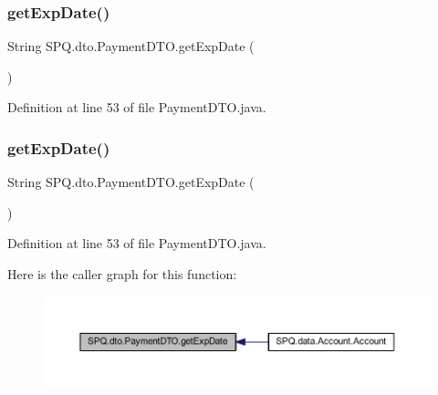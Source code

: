 \subsubsection{\texorpdfstring{get\+Exp\+Date()}{getExpDate()}\hspace{0.1cm}{\footnotesize\ttfamily [2/3]}}
{\footnotesize\ttfamily String S\+P\+Q.\+dto.\+Payment\+D\+T\+O.\+get\+Exp\+Date (\begin{DoxyParamCaption}{ }\end{DoxyParamCaption})}



Definition at line 53 of file Payment\+D\+T\+O.\+java.

\mbox{\label{class_s_p_q_1_1dto_1_1_payment_d_t_o_aa91402a8c96a306fcf125973e4f35912}} 
\subsubsection{\texorpdfstring{get\+Exp\+Date()}{getExpDate()}\hspace{0.1cm}{\footnotesize\ttfamily [3/3]}}
{\footnotesize\ttfamily String S\+P\+Q.\+dto.\+Payment\+D\+T\+O.\+get\+Exp\+Date (\begin{DoxyParamCaption}{ }\end{DoxyParamCaption})}



Definition at line 53 of file Payment\+D\+T\+O.\+java.

Here is the caller graph for this function\+:
\nopagebreak
\begin{figure}[H]
\begin{center}
\leavevmode
\includegraphics[width=350pt]{class_s_p_q_1_1dto_1_1_payment_d_t_o_aa91402a8c96a306fcf125973e4f35912_icgraph}
\end{center}
\end{figure}
\mbox{\label{class_s_p_q_1_1dto_1_1_payment_d_t_o_ae012449dd0baea7f169bb64dcf973dec}} 

